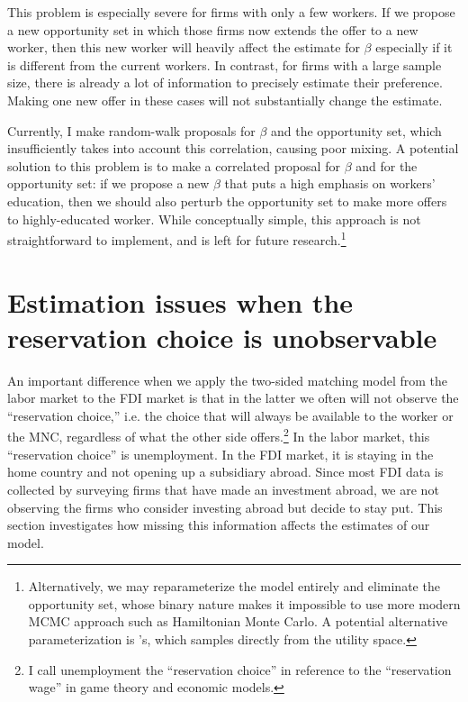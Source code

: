 This problem is especially severe for firms with only a few workers. If we
propose a new opportunity set in which those firms now extends the offer to a
new worker, then this new worker will heavily affect the estimate for $\beta$
especially if it is different from the current workers. In contrast, for firms
with a large sample size, there is already a lot of information to precisely estimate
their preference. Making one new offer in these cases will not substantially change the
estimate.

Currently, I make random-walk proposals for $\beta$ and the opportunity set,
which insufficiently takes into account this correlation, causing poor mixing. A
potential solution to this problem is to make a correlated proposal for $\beta$
and for the opportunity set: if we propose a new $\beta$ that
puts a high emphasis on workers' education, then we should also perturb the
opportunity set to make more offers to highly-educated worker. While
conceptually simple, this approach is not straightforward to implement, and is
left for future research.\footnote{Alternatively, we may reparameterize the
  model entirely and eliminate the opportunity set, whose binary nature makes it
impossible to use more modern MCMC approach such as Hamiltonian Monte Carlo. A
potential alternative parameterization is \citet{Logan2008}'s, which samples
directly from the utility space.}

\section{Estimation issues when the reservation choice is unobservable}
\label{sec:reservation_choice}

An important difference when we apply the two-sided matching model from the
labor market to the FDI market is that in the latter we often will not observe
the ``reservation choice,'' i.e. the choice that will always be available to the
worker or the MNC, regardless of what the other side offers.\footnote{I call
  unemployment the ``reservation choice'' in reference to the ``reservation
  wage'' in game theory and economic models.} In the labor
market, this ``reservation choice'' is unemployment. In the FDI market, it is
staying in the home country and not opening up a subsidiary abroad. Since most
FDI data is collected by surveying firms that have made an investment abroad, we
are not observing the firms who consider investing abroad but decide to stay
put. This section investigates how missing this information affects the
estimates of our model.

